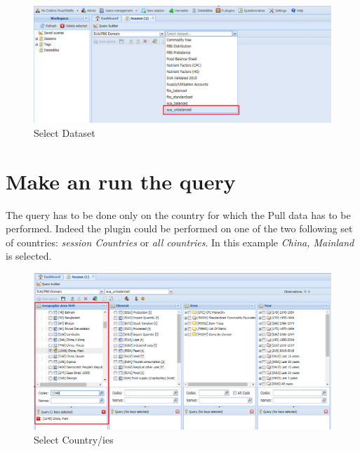 \documentclass[]{article}
\begin{document}
\begin{figure}[H]

{\centering \includegraphics[width=1\linewidth]{images/pullData/05_dataset} 

}

\caption{\label{fig:f5}Select Dataset}\label{fig:f5}
\end{figure}

\newpage

\section{Make an run the query}\label{make-an-run-the-query}

The query has to be done only on the country for which the Pull data has
to be performed. Indeed the plugin could be performed on one of the two
following set of countries: \emph{session Countries} or \emph{all
countries}. In this example \emph{China, Mainland} is selected.

\begin{figure}[H]

{\centering \includegraphics[width=1\linewidth]{images/pullData/06_selectCountry} 

}

\caption{\label{fig:f6}Select Country/ies}\label{fig:f6}
\end{figure}
\end{document}
